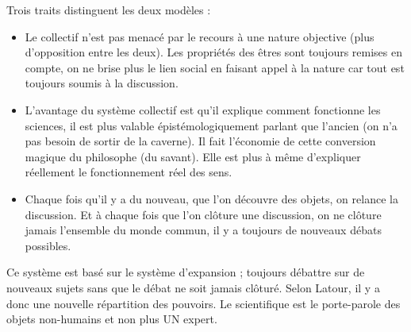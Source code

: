 Trois traits distinguent les deux modèles :
\begin{itemize}
	\item Le collectif n'est pas menacé par le recours à une nature objective (plus d'opposition entre les deux).
		Les propriétés des êtres sont toujours remises en compte, on ne brise plus le lien social en faisant appel à la nature car tout est toujours soumis à la discussion.
	\item L'avantage du système collectif est qu'il explique comment fonctionne les sciences, il est plus valable épistémologiquement parlant que l'ancien (on n'a pas besoin de sortir de la caverne).
		Il fait l'économie de cette conversion magique du philosophe (du savant).
		Elle est plus à même d'expliquer réellement le fonctionnement réel des sens.
	\item Chaque fois qu'il y a du nouveau, que l'on découvre des objets, on relance la discussion.
		Et à chaque fois que l'on clôture une discussion, on ne clôture jamais l'ensemble du monde commun, il y a toujours de nouveaux débats possibles.
\end{itemize}
Ce système est basé sur le système d'expansion ; toujours débattre sur de nouveaux sujets sans que le débat ne soit jamais clôturé.
Selon Latour, il y a donc une nouvelle répartition des pouvoirs.
Le scientifique est le porte-parole des objets non-humains et non plus UN expert.


